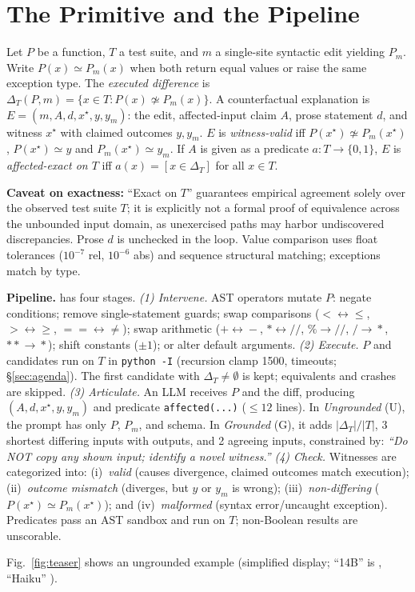\section{The Primitive and the \CoDE Pipeline}\label{sec:approach}
\begin{definition}\label{def:cfe}
Let $P$ be a function, $T$ a test suite, and $m$ a single-site syntactic edit yielding $P_m$. Write $P(x)\simeq P_m(x)$ when both return equal values or raise the same exception type. The \emph{executed difference} is $\Delta_T(P,m)=\{x\in T : P(x)\not\simeq P_m(x)\}$. A counterfactual explanation is $E=(m,A,d,x^\star,y,y_m)$: the edit, affected-input claim $A$, prose statement $d$, and witness $x^\star$ with claimed outcomes $y,y_m$. $E$ is \emph{witness-valid} iff $P(x^\star)\not\simeq P_m(x^\star)$, $P(x^\star)\simeq y$ and $P_m(x^\star)\simeq y_m$. If $A$ is given as a predicate $a:T\to\{0,1\}$, $E$ is \emph{affected-exact on $T$} iff $a(x)=[x\in\Delta_T]$ for all $x\in T$.
\end{definition}
\textbf{Caveat on exactness:} ``Exact on $T$'' guarantees empirical agreement solely over the observed test suite $T$; it is explicitly not a formal proof of equivalence across the unbounded input domain, as unexercised paths may harbor undiscovered discrepancies. Prose $d$ is unchecked in the loop. Value comparison uses float tolerances ($10^{-7}$ rel, $10^{-6}$ abs) and sequence structural matching; exceptions match by type.

\textbf{Pipeline.} \CoDE has four stages.
\emph{(1) Intervene.} AST operators mutate $P$: negate conditions; remove single-statement guards; swap comparisons ($<\!\leftrightarrow\!\le$, $>\!\leftrightarrow\!\ge$, $==\!\leftrightarrow\!\neq$); swap arithmetic ($+\!\leftrightarrow\!-$, $*\!\leftrightarrow\!/\!/$, $\%\!\to\!/\!/$, $/\!\to\!*$, $**\!\to\!*$); shift constants ($\pm1$); or alter default arguments.
\emph{(2) Execute.} $P$ and candidates run on $T$ in \texttt{python -I} (recursion clamp 1500, timeouts; \S\ref{sec:agenda}). The first candidate with $\Delta_T\neq\emptyset$ is kept; equivalents and crashes are skipped.
\emph{(3) Articulate.} An LLM receives $P$ and the diff, producing $(A,d,x^\star,y,y_m)$ and predicate \texttt{affected(...)} ($\le12$ lines). In \emph{Ungrounded} (U), the prompt has only $P$, $P_m$, and schema. In \emph{Grounded} (G), it adds $|\Delta_T|/|T|$, 3 shortest differing inputs with outputs, and 2 agreeing inputs, constrained by: \emph{``Do NOT copy any shown input; identify a novel witness.''}
\emph{(4) Check.} Witnesses are categorized into: (i)~\emph{valid} (causes divergence, claimed outcomes match execution); (ii)~\emph{outcome mismatch} (diverges, but $y$ or $y_m$ is wrong); (iii)~\emph{non-differing} ($P(x^\star)\simeq P_m(x^\star)$); and (iv)~\emph{malformed} (syntax error/uncaught exception). Predicates pass an AST sandbox and run on $T$; non-Boolean results are unscorable.

Fig.~\ref{fig:teaser} shows an ungrounded example (simplified display; ``14B'' is \GenModel, ``Haiku'' \StrongModel).

